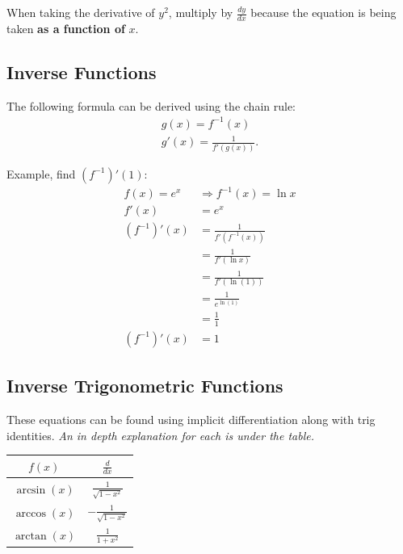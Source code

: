 \documentclass[12pt]{article}
\begin{document}
When taking the derivative of $y^2$, multiply by $\frac{dy}{dx}$ because the equation is being taken \textbf{as a function of} $x$.

\subsection{Inverse Functions}
\noindent The following formula can be derived using the chain rule:
\begin{gather*}
	g(x) = f^{-1}(x) \\
	g'(x) = \frac{1}{f'\left( g(x) \right)}.
\end{gather*}

\noindent Example, find $(f^{-1})'(1)$:
\begin{align*}
	f(x) = e^x   & \Rightarrow f^{-1}(x) = \ln{x}          \\
	f'(x)        & = e^x                                   \\
	(f^{-1})'(x) & = \frac{1}{f' \left( f^{-1}(x) \right)} \\[6pt]
	& = \frac{1}{f'(\ln{x})}                  \\[6pt]
	& = \frac{1}{f'(\ln{(1)})}                \\[6pt]
	& = \frac{1}{e^{\ln{(1)}}}                \\[6pt]
	& = \frac{1}{1}                           \\[6pt]
	(f^{-1})'(x) & = 1
\end{align*}

\subsection{Inverse Trigonometric Functions}
These equations can be found using implicit differentiation along with trig identities. \textit{An in depth explanation for each is under the table.}
\begin{center}
	\begin{tabular}{|c|c|}
		\hline
		$f(x)$       & $\frac{d}{dx}$            \\
		\hline \hline
		$\arcsin(x)$ & $\frac{1}{\sqrt{1-x^2}}$  \\
		\hline
		$\arccos(x)$ & $-\frac{1}{\sqrt{1-x^2}}$ \\
		\hline
		$\arctan(x)$ & $\frac{1}{1+x^2}$         \\
		\hline
	\end{tabular}
\end{center}
\end{document}
